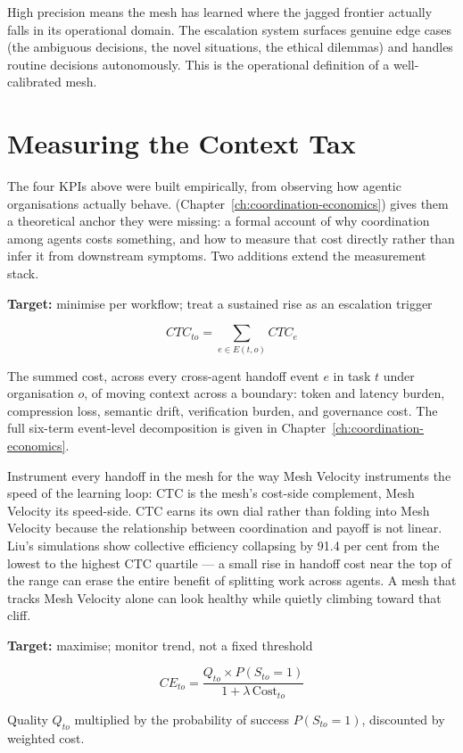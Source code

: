 High precision means the mesh has learned where the jagged frontier actually falls in its operational domain. The escalation system surfaces genuine edge cases (the ambiguous decisions, the novel situations, the ethical dilemmas) and handles routine decisions autonomously. This is the operational definition of a well-calibrated mesh.

\section{Measuring the Context Tax}

The four KPIs above were built empirically, from observing how agentic organisations actually behave. \textcite{Liu2026} (Chapter~\ref{ch:coordination-economics}) gives them a theoretical anchor they were missing: a formal account of why coordination among agents costs something, and how to measure that cost directly rather than infer it from downstream symptoms. Two additions extend the measurement stack.

\begin{definitionbox}[title={Contextual Transaction Cost (CTC)}]
\textbf{Target:} minimise per workflow; treat a sustained rise as an escalation trigger

\[
CTC_{to} = \sum_{e \in E(t,o)} CTC_e
\]

The summed cost, across every cross-agent handoff event $e$ in task $t$ under organisation $o$, of moving context across a boundary: token and latency burden, compression loss, semantic drift, verification burden, and governance cost. The full six-term event-level decomposition is given in Chapter~\ref{ch:coordination-economics}.
\end{definitionbox}

Instrument every handoff in the mesh for  the way Mesh Velocity instruments the speed of the learning loop: CTC is the mesh's cost-side complement, Mesh Velocity its speed-side. CTC earns its own dial rather than folding into Mesh Velocity because the relationship between coordination and payoff is not linear. Liu's simulations show collective efficiency collapsing by 91.4 per cent from the lowest to the highest CTC quartile --- a small rise in handoff cost near the top of the range can erase the entire benefit of splitting work across agents. A mesh that tracks Mesh Velocity alone can look healthy while quietly climbing toward that cliff.

\begin{definitionbox}[title={Collective Efficiency (CE)}]
\textbf{Target:} maximise; monitor trend, not a fixed threshold

\[
CE_{to} = \frac{Q_{to} \times P(S_{to}=1)}{1 + \lambda\,\mathrm{Cost}_{to}}
\]

Quality $Q_{to}$ multiplied by the probability of success $P(S_{to}=1)$, discounted by weighted cost.
\end{definitionbox}

